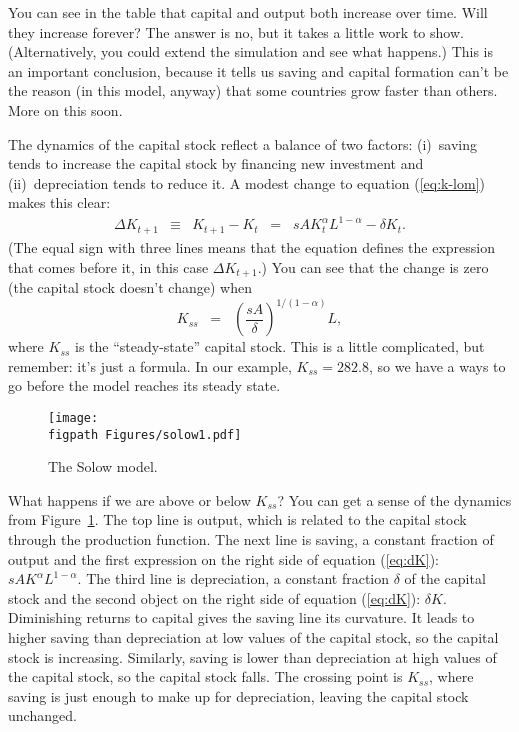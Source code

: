 You can see in the table
that capital and output both increase over time.
Will they increase forever?
The answer is no, but it takes a little work to
show. (Alternatively, you could extend the simulation and see what
happens.)
This is an important conclusion, because it tells us saving
and capital formation can't be the reason
(in this model, anyway)
that some countries grow faster than others.  More on this soon.


The dynamics of the capital stock reflect a balance of two factors:
(i)~saving tends to increase the capital stock by financing new investment
and (ii)~depreciation tends to reduce it.
A modest change to equation (\ref{eq:k-lom}) makes this clear:
\begin{eqnarray}
    \Delta K_{t+1} &\equiv& K_{t+1} - K_t
            \;\;=\;\;  s A K_t^\alpha L^{1-\alpha} - \delta K_t .
            \label{eq:dK}
\end{eqnarray}
(The equal sign with three lines means that the equation defines
the expression that comes before it, in this case $\Delta K_{t+1}$.)
You can see that the change is zero (the capital stock doesn't change)
when
\[
    K_{ss} \;\;=\;\; \left( \frac{s A}{\delta} \right)^{1/(1-\alpha)} L ,
\]
where $K_{ss}$ is the ``steady-state'' capital stock.
This is a little complicated, but remember:  it's just a formula.
In our example, $K_{ss} = 282.8$, so we have a ways to go before the model reaches
its steady state.
\begin{figure}[h]
    \caption{The Solow model.}
    \centering
    \texttt{[image: \\figpath Figures/solow1.pdf]}\\
    \label{fig:solow1}
\end{figure}

What happens if we are above or below $K_{ss}$?
You can get a sense of the dynamics from Figure~\ref{fig:solow1}.
The top line is output,
which is related to the capital stock through the production function.
The next line is saving, a constant fraction of output
and the first expression on the right side of equation (\ref{eq:dK}):  $s A K^\alpha L^{1-\alpha} $.
The third line is depreciation, a constant fraction $\delta$
of the capital stock and the second object on the right side of equation (\ref{eq:dK}):  $\delta K $.
Diminishing returns to capital gives the saving line its curvature.
It leads to higher saving than depreciation at low
values of the capital stock, so the capital stock is increasing.
Similarly, saving is lower than depreciation at high values of the capital stock,
so the capital stock falls.
The crossing point is $K_{ss}$, where saving is just enough to
make up for depreciation, leaving the capital stock unchanged.


